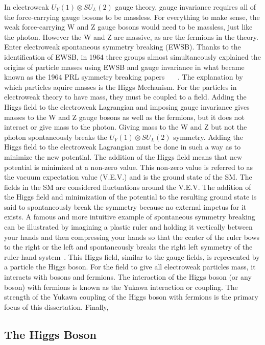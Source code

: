 In electroweak $U_{Y}(1) \otimes SU_{L}(2)$ gauge theory, gauge invariance requires all of the force-carrying gauge bosons to be massless.
For everything to make sense, the weak force-carrying W and Z gauge bosons would need to be massless, just like the photon. 
However the W and Z are massive, as are the fermions in the theory. Enter electroweak spontaneous symmetry breaking (EWSB). Thanks to the identification of EWSB, in 1964 
three groups almost simultaneously explained the origins of particle masses using EWSB and gauge invariance in what became known as the 1964 PRL symmetry breaking papers
~\cite{1964_prl_englert}~\cite{1964_prl_higgs}~\cite{1964_prl_guralnik}.
The explanation by which particles aquire masses is the Higgs Mechanism. For the particles in electroweak theory to have mass, they must be coupled to a field.
Adding the Higgs field to the electroweak Lagrangian and imposing gauge invariance gives masses to the W and Z gauge bosons as well as the fermions, but it does not interact
or give mass to the photon. Giving mass to the W and Z but not the photon spontaneously breaks the $U_{Y}(1) \otimes SU_{L}(2)$ symmetry.
Adding the Higgs field to the electroweak Lagrangian must be done in such a way as to minimize the new potential. The addition of the Higgs field means that new potential
is minimized at a non-zero value. This non-zero value is referred to as the vacuum expectation value (V.E.V.) and is the ground state of the SM.
The fields in the SM are considered fluctuations around the V.E.V. The addition of the Higgs field and minimization of the potential to the resulting ground state
is said to spontaneously break the symmetry because no external impetus for it exists. A famous and more intuitive example of spontaneous symmetry breaking can be illustrated
by imagining a plastic ruler and holding it vertically between your hands and then compressing your hands so that the center of the ruler bows to the right or the left and
spontaneously breaks the right left symmetry of the ruler-hand system~\cite{robinson}. 
This Higgs field, similar to the gauge fields, is represented by a particle the Higgs boson.
For the field to give all electroweak particles mass, it interacts with bosons and fermions.
The interaction of the Higgs boson (or any boson) with fermions is known as the Yukawa interaction or coupling. The strength of the Yukawa coupling
of the Higgs boson with fermions is the primary focus of this dissertation. Finally, 

\subsection{The Higgs Boson}

